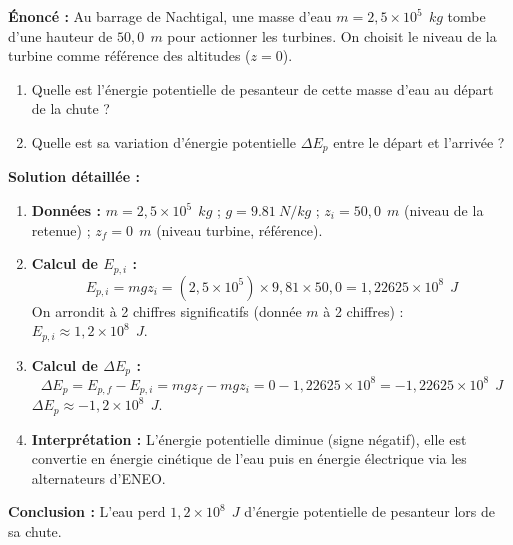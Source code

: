 \documentclass[11pt]{article}
\begin{document}
\begin{exoresolu}
    \textbf{Énoncé :} Au barrage de Nachtigal, une masse d'eau $m = 2,5 \times 10^5\ \SI{}{kg}$ tombe d'une hauteur de $50,0\ \SI{}{m}$ pour actionner les turbines. On choisit le niveau de la turbine comme référence des altitudes ($z=0$).
    \begin{enumerate}
        \item Quelle est l'énergie potentielle de pesanteur de cette masse d'eau au départ de la chute ?
        \item Quelle est sa variation d'énergie potentielle $\Delta E_p$ entre le départ et l'arrivée ?
    \end{enumerate}
    \tcblower
    \textbf{Solution détaillée :}
    \begin{enumerate}
        \item \textbf{Données :} $m = 2,5 \times 10^5\ \SI{}{kg}$ ; $g = \SI{9,81}{N/kg}$ ; $z_i = 50,0\ \SI{}{m}$ (niveau de la retenue) ; $z_f = 0\ \SI{}{m}$ (niveau turbine, référence).
        \item \textbf{Calcul de $E_{p,i}$ :}
        \[ E_{p,i} = m g z_i = (2,5 \times 10^5) \times 9,81 \times 50,0 = 1,22625 \times 10^8\ \SI{}{J} \]
        On arrondit à 2 chiffres significatifs (donnée $m$ à 2 chiffres) : $\boxed{E_{p,i} \approx 1,2 \times 10^8\ \SI{}{J}}$.
        \item \textbf{Calcul de $\Delta E_p$ :}
        \[ \Delta E_p = E_{p,f} - E_{p,i} = m g z_f - m g z_i = 0 - 1,22625 \times 10^8 = -1,22625 \times 10^8\ \SI{}{J} \]
        $\boxed{\Delta E_p \approx -1,2 \times 10^8\ \SI{}{J}}$.
        \item \textbf{Interprétation :} L'énergie potentielle diminue (signe négatif), elle est convertie en énergie cinétique de l'eau puis en énergie électrique via les alternateurs d'ENEO.
    \end{enumerate}
    \textbf{Conclusion :} L'eau perd $1,2 \times 10^8\ \SI{}{J}$ d'énergie potentielle de pesanteur lors de sa chute.
\end{exoresolu}
\end{document}
